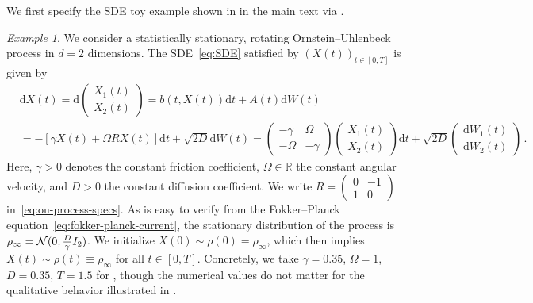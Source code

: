 \documentclass[oneside,11pt]{article}
\theoremstyle{remark}
\newtheorem{example}{Example}
\begin{document}
We first specify the SDE toy example shown in  in the main text via .

\begin{example} \label{example:ou-rotate}
    We consider a statistically stationary, rotating Ornstein--Uhlenbeck process in $d = 2$ dimensions. The SDE~\eqref{eq:SDE} satisfied by $(X(t))_{t \in [0,T]}$ is given by
    \begin{align}
    &\mathrm{d} X(t) =
    \mathrm{d} \begin{pmatrix}
        X_1(t)\\ X_2(t)
    \end{pmatrix} = b(t, X(t)) \mathrm{d}t + A(t) \mathrm{d}W(t)  \label{eq:ou-process-specs} \\
   &= - \left[\gamma X(t) + \Omega R X(t)\right] \mathrm{d}t + \sqrt{2D} \mathrm{d} W(t) = \begin{pmatrix}
       -\gamma & \Omega\\
       -\Omega & - \gamma
   \end{pmatrix} \begin{pmatrix}
        X_1(t)\\ X_2(t)
    \end{pmatrix} \mathrm{d} t + 
\sqrt{2D}   
   \begin{pmatrix}
        \mathrm{d}W_1(t) \\ \mathrm{d}W_2(t)
    \end{pmatrix}\,.
    \nonumber
    \end{align}
    Here, $\gamma > 0$ denotes the constant friction coefficient, $\Omega \in \mathbb{R}$ the constant angular velocity, and $D > 0$ the constant diffusion coefficient. We write $R = \begin{pmatrix}
        0 & -1\\
        1 & 0
    \end{pmatrix}$ in~\eqref{eq:ou-process-specs}. As is easy to verify from the Fokker--Planck equation~\eqref{eq:fokker-planck-current}, the stationary distribution of the process is $\rho_\infty = {\cal N}(0, \tfrac{D}{\gamma}I_2)$. We initialize $X(0) \sim \rho(0) = \rho_\infty$, which then implies $X(t) \sim \rho(t) \equiv \rho_\infty$ for all $t \in [0,T]$. Concretely, we take $\gamma = 0.35$, $\Omega = 1$, $D = 0.35$, $T = 1.5$ for , though the numerical values do not matter for the qualitative behavior illustrated in .
\end{example}
\end{document}
